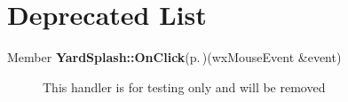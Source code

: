 \section{Deprecated List}\label{deprecated}
\label{_deprecated000001}
 \begin{description}
\item[Member {\bf Yard\-Splash::On\-Click}{\rm (p.\,\pageref{classYardSplash_a2})}(wx\-Mouse\-Event \&event) ]This handler is for testing only and will be removed \end{description}
